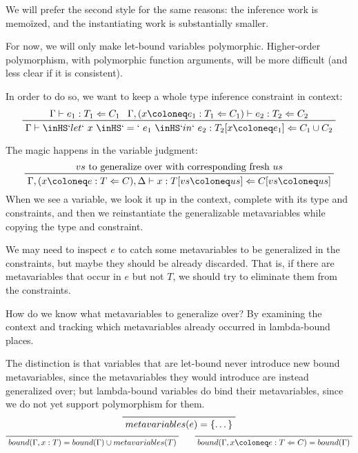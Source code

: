 \documentclass[11pt, twoside, reqno]{book}
\begin{document}
We will prefer the second style for the same reasons: the inference work is memo\"ized, and the instantiating work is substantially smaller.

For now, we will only make let-bound variables polymorphic.
Higher-order polymorphism, with polymorphic function arguments, will be more difficult (and less clear if it is consistent).

In order to do so, we want to keep a whole type inference constraint in context:
\begin{displaymath}
\prftree{\Gamma \vdash e_1 : T_1 \Leftarrow C_1}{\Gamma, (x \coloneq e_1 : T_1 \Leftarrow C_1) \vdash e_2 : T_2 \Leftarrow C_2}{\Gamma \vdash \inHS`let`\ x\ \inHS`=`\ e_1\ \inHS`in`\ e_2 : T_2[x \coloneq e_1] \Leftarrow C_1 \cup C_2}
\end{displaymath}

The magic happens in the variable judgment:
\begin{displaymath}
\prftree{vs\text{\ to generalize over with corresponding fresh\ } us}{\Gamma, (x \coloneq e : T \Leftarrow C), \Delta \vdash x : T[vs \coloneq us] \Leftarrow C[vs \coloneq us]}
\end{displaymath}
When we see a variable, we look it up in the context, complete with its type and constraints, and then we reinstantiate the generalizable metavariables while copying the type and constraint.

\begin{mdframed}[style=Note]
We may need to inspect \(e\) to catch some metavariables to be generalized in the constraints, but maybe they should be already discarded.
That is, if there are metavariables that occur in \(e\) but not \(T\), we should try to eliminate them from the constraints.
\end{mdframed}

How do we know what metavariables to generalize over?
By examining the context and tracking which metavariables already occurred in lambda-bound places.

The distinction is that variables that are let-bound never introduce new bound metavariables, since the metavariables they would introduce are instead generalized over; but lambda-bound variables do bind their metavariables, since we do not yet support polymorphism for them.
\begin{displaymath}
\prftree{metavariables(e) = \{\dots\}}
\end{displaymath}
\begin{displaymath}
\prftree{bound(\Gamma, x : T) = bound(\Gamma) \cup metavariables(T)}
\qquad
\prftree{bound(\Gamma, x \coloneq e : T \Leftarrow C) = bound(\Gamma)}
\end{displaymath}
\end{document}
